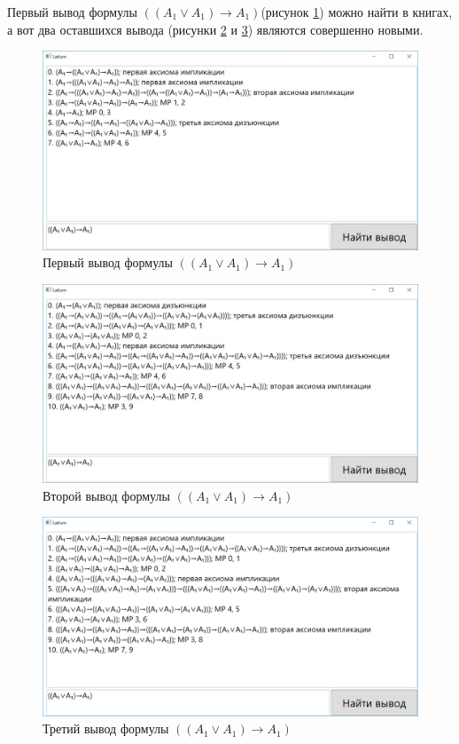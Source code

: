 \documentclass[a4paper,12pt]{article}
\theoremstyle{definition}
\begin{document}
	Первый вывод формулы $\left( \left( A_{1} \lor A_{1}\right) \to A_{1}\right)  $(рисунок \ref{ex3.1}) можно найти в книгах, а вот два оставшихся вывода (рисунки \ref{ex3.2} и \ref{ex3.3}) являются совершенно новыми.  
	
	\begin{figure}[h]
		\begin{center}
			\includegraphics[width=0.8\linewidth]{ex31}
		\end{center}
		\caption{Первый вывод формулы $\left( \left( A_{1} \lor A_{1}\right) \to A_{1}\right)  $}
		\label{ex3.1}
	\end{figure}

	\begin{figure}[h]
		\begin{center}
			\includegraphics[width=0.8\linewidth]{ex32}
		\end{center}
		\caption{Второй вывод формулы $\left( \left( A_{1} \lor A_{1}\right) \to A_{1}\right)  $}
		\label{ex3.2}
	\end{figure}

	\begin{figure}[h]
		\begin{center}
			\includegraphics[width=0.8\linewidth]{ex33}
		\end{center}
		\caption{Третий вывод формулы $\left( \left( A_{1} \lor A_{1}\right) \to A_{1}\right)  $}
		\label{ex3.3}
	\end{figure}
	
\end{document}
